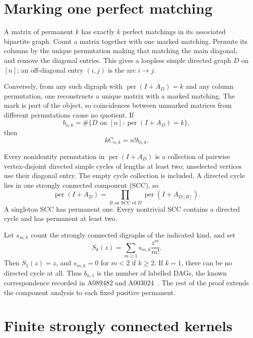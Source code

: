 \documentclass[11pt]{article}
\theoremstyle{definition}\newtheorem{definition}[theorem]{Definition}
\theoremstyle{remark}\newtheorem{remark}[theorem]{Remark}
\newcommand{\Per}{\operatorname{per}}
\begin{document}
\section{Marking one perfect matching}\label{fpm:sec:matching}
A matrix of permanent $k$ has exactly $k$ perfect matchings in its associated bipartite graph. Count a matrix together with one marked matching. Permute its columns by the unique permutation making that matching the main diagonal, and remove the diagonal entries. This gives a loopless simple directed graph $D$ on $[n]$; an off-diagonal entry $(i,j)$ is the arc $i\to j$.

Conversely, from any such digraph with $\Per(I+A_D)=k$ and any column permutation, one reconstructs a unique matrix with a marked matching. The mark is part of the object, so coincidences between unmarked matrices from different permutations cause no quotient. If
\[
 b_{n,k}=\#\{D\text{ on }[n]:\Per(I+A_D)=k\},
\]
then
\begin{equation}\label{fpm:eq:marked}
 kC_{n,k}=n!b_{n,k}.
\end{equation}

Every nonidentity permutation in $\Per(I+A_D)$ is a collection of pairwise vertex-disjoint directed simple cycles of lengths at least two; unselected vertices use their diagonal entry. The empty cycle collection is included. A directed cycle lies in one strongly connected component (SCC), so
\begin{equation}\label{fpm:eq:multiplicative}
 \Per(I+A_D)=\prod_{B\text{ an SCC of }D}\Per(I+A_{D[B]}).
\end{equation}
A singleton SCC has permanent one. Every nontrivial SCC contains a directed cycle and has permanent at least two.

Let $s_{m,k}$ count the strongly connected digraphs of the indicated kind, and set
\begin{equation}\label{fpm:eq:Sk}
 S_k(z)=\sum_{m\ge1}s_{m,k}\frac{z^m}{m!}.
\end{equation}
Then $S_1(z)=z$, and $s_{m,k}=0$ for $m<2$ if $k\ge2$. If $k=1$, there can be no directed cycle at all. Thus $b_{n,1}$ is the number of labelled DAGs, the known correspondence recorded in A089482 and A003024~\cite{perone,dag}. The rest of the proof extends the component analysis to each fixed positive permanent.

\section{Finite strongly connected kernels}\label{fpm:sec:kernels}
\end{document}
